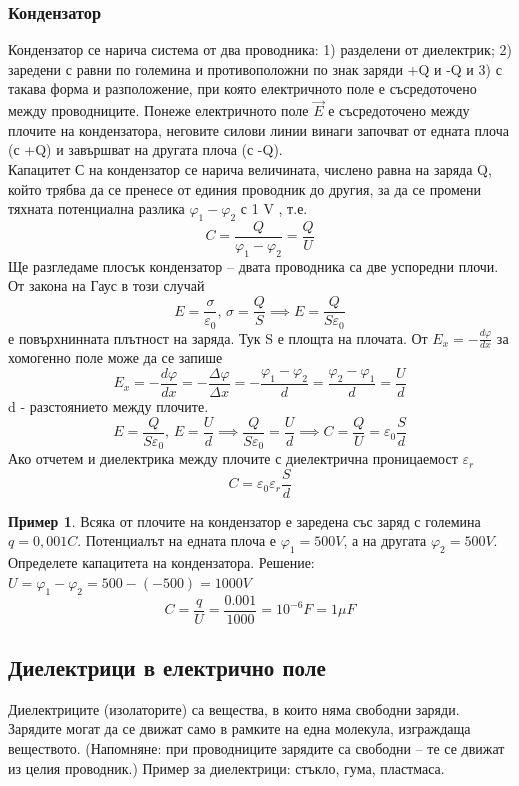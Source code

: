 \documentclass[fleqn, 12pt]{article}
\theoremstyle{definition}
\newtheorem{example}{Пример}[subsection]
\begin{document}
\subsubsection{Кондензатор}
Кондензатор се нарича система от два проводника: 1) разделени от диелектрик; 2)
заредени с равни по големина и противоположни по знак заряди +Q и -Q и 3) с такава
форма и разположение, при която електричното поле е съсредоточено между
проводниците. Понеже електричното поле $\vec{E}$ е съсредоточено между плочите на
кондензатора, неговите силови линии винаги започват от едната плоча (с +Q) и
завършват на другата плоча (с -Q). \\
Капацитет С на кондензатор се нарича величината, числено равна на заряда Q, който
трябва да се пренесе от единия проводник до другия, за да се промени тяхната
потенциална разлика $\varphi_1 - \varphi_2 $ с 1 V , т.е. 
$$C = \frac{Q}{\varphi_1 - \varphi_2} = \frac{Q}{U}$$
Ще разгледаме плосък кондензатор – двата проводника са две успоредни плочи. От
закона на Гаус в този случай
$$E = \frac{\sigma}{\varepsilon_0},\, \sigma = \frac{Q}{S} \implies E = \frac{Q}{S\varepsilon_0} $$
 е повърхнинната плътност
на заряда. Тук S е площта на плочата. От $E_x = - \frac{d \varphi}{dx}$  за хомогенно поле може да се
запише
$$E_x = - \frac{d \varphi}{dx} = - \frac{\Delta \varphi}{\Delta x} = -\frac{\varphi_1 - \varphi_2}{d} = \frac{\varphi_2 - \varphi_1}{d}= \frac{U}{d}$$
d - разстоянието между плочите.
$$E = \frac{Q}{S \varepsilon_0}, \, E = \frac{U}{d} \implies \frac{Q}{S \varepsilon_0} = \frac{U}{d} \implies C = \frac{Q}{U} = \varepsilon_0 \frac{S}{d}$$
Ако отчетем и диелектрика между плочите с диелектрична проницаемост $\varepsilon_r$
$$C = \varepsilon_0 \varepsilon_r \frac{S}{d}$$

\begin{example}
Всяка от плочите на кондензатор е заредена със заряд с големина
$q = 0,001C$. Потенциалът на едната плоча е $\varphi_1 = 500 V$, а на другата $\varphi_2 = 500 V $.
Определете капацитета на кондензатора.
Решение: $U = \varphi_1 - \varphi_2 = 500 - (-500) = 1000V$
$$C = \frac{q}{U} = \frac{0.001}{1000} = 10^{-6} F = 1 \mu F$$
\end{example}

\subsection{Диелектрици в електрично поле}
Диелектриците (изолаторите) са вещества, в които няма свободни заряди.
Зарядите могат да се движат само в рамките на една молекула, изграждаща веществото.
(Напомняне: при проводниците зарядите са свободни – те се движат из целия
проводник.) Пример за диелектрици: стъкло, гума, пластмаса. 
\end{document}
